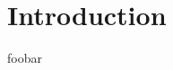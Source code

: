 \documentclass[shortabstract, manyadvisors, english, mgr]{iithesis}
\author{Jakub Piecuch}
\begin{document}
\chapter{Introduction}
\label{chapter:1}
foobar

\begin{thebibliography}{99}

\end{thebibliography}
\end{document}

